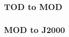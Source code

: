 \documentclass[12pt,letterpaper]{paper}
\begin{document}
\subsubsection{TOD to MOD}


\subsubsection{MOD to J2000}

%
%
%
%
%
%
%
%
%
%
%
\end{document}
